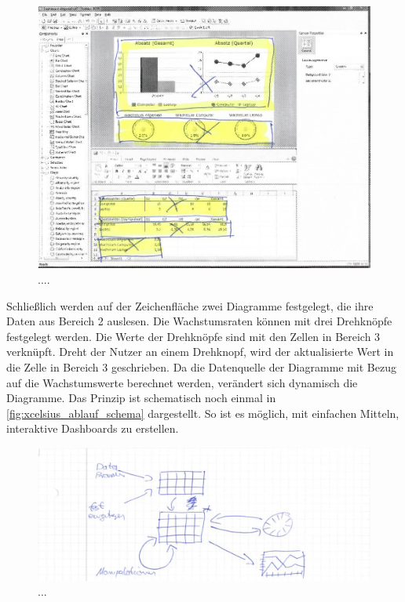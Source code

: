 \begin{onehalfspacing}
\begin{figure}[h]
\centering
\setlength{\unitlength}{1mm}
\includegraphics[width=15cm]{images/Xcelsius_UI_Beispiel.jpg}
\caption{....\label{fig:xcelsius_ui_beispiel}}
\end{figure} 

Schließlich werden auf der Zeichenfläche zwei Diagramme festgelegt, die ihre Daten aus Bereich 2 auslesen. Die Wachstumsraten können mit drei Drehknöpfe festgelegt werden. Die Werte der Drehknöpfe sind mit den Zellen in Bereich 3 verknüpft. Dreht der Nutzer an einem Drehknopf, wird der aktualisierte Wert in die Zelle in Bereich 3 geschrieben. Da die Datenquelle der Diagramme mit Bezug auf die Wachstumswerte berechnet werden, verändert sich dynamisch die Diagramme. Das Prinzip ist schematisch noch einmal in \vref{fig:xcelsius_ablauf_schema} dargestellt. So ist es möglich, mit einfachen Mitteln, interaktive Dashboards zu erstellen.

\begin{figure}[h]
\centering
\setlength{\unitlength}{1mm}
\includegraphics[width=15cm]{images/Xcelsius_UI_Ablauf.jpg}
\caption{...\label{fig:xcelsius_ablauf_schema}}
\end{figure}  


\end{onehalfspacing}
